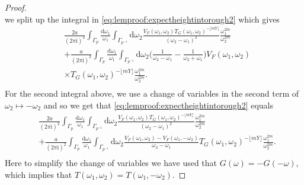 \documentclass[11pt,twoside]{amsart}
\theoremstyle{plain}
\numberwithin{quest}{section}
\theoremstyle{remark}
\numberwithin{rem}{section}
\theoremstyle{definition}
\begin{document}
{\begin{proof}
\begin{equation*}
			\end{equation*}
			we split up the integral in \eqref{eq:lemproof:expectheightintorough2} which gives
			\begin{equation*}
				\begin{split}
					&\frac{2a}{(2\pi \mathrm{i})^2}  \int_{\Gamma_p}\frac{\mathrm{d} \omega_1}{\omega_1} \int_{\Gamma_{p^{-1}}} \mathrm{d}\omega_2 \frac{V_F(\omega_1,\omega_2)T_G(\omega_1,\omega_2)^{-\lfloor mY \rfloor}}{(\omega_2-\omega_1)^2} \frac{\omega_1^{2m}}{\omega_2^{2m}} \\
					&+\frac{a}{(2\pi \mathrm{i})^2}  \int_{\Gamma_p}\frac{\mathrm{d} \omega_1}{\omega_1} \int_{\Gamma_{p^{-1}}} \mathrm{d}\omega_2 \bigg(\frac{1}{\omega_2-\omega_1}-\frac{1}{\omega_2+\omega_1} \bigg)V_F(\omega_1,\omega_2) \\
					&\times T_G(\omega_1,\omega_2)^{-\lfloor mY \rfloor} \frac{\omega_1^{2m}}{\omega_2^{2m}} .
					\\
				\end{split}
			\end{equation*}
			For the second integral above, we use a change of variables in the second term of $\omega_2\mapsto -\omega_2$ and so we get that \eqref{eq:lemproof:expectheightintorough2} equals
			\begin{equation*}
				\begin{split}
					&\frac{2a}{(2\pi \mathrm{i})^2}  \int_{\Gamma_p}\frac{\mathrm{d} \omega_1}{\omega_1} \int_{\Gamma_{p^{-1}}} \mathrm{d}\omega_2 \frac{V_F(\omega_1,\omega_2)T_G(\omega_1,\omega_2)^{-\lfloor mY \rfloor}}{(\omega_2-\omega_1)^2} \frac{\omega_1^{2m}}{\omega_2^{2m}} \\
					&+\frac{a}{(2\pi \mathrm{i})^2}  \int_{\Gamma_p}\frac{\mathrm{d} \omega_1}{\omega_1} \int_{\Gamma_{p^{-1}}} \mathrm{d}\omega_2 \frac{V_F(\omega_1,\omega_2)-V_F(\omega_1,-\omega_2)}{\omega_2-\omega_1}  T_G(\omega_1,\omega_2)^{-\lfloor mY \rfloor} \frac{\omega_1^{2m}}{\omega_2^{2m}} .
					\\
				\end{split}
			\end{equation*}
            Here to simplify the change of variables we have used that $G(\omega) = -G(-\omega)$, which implies that $T(\omega_1, \omega_2) = T(\omega_1, -\omega_2)$.

\end{proof}}
\end{document}
